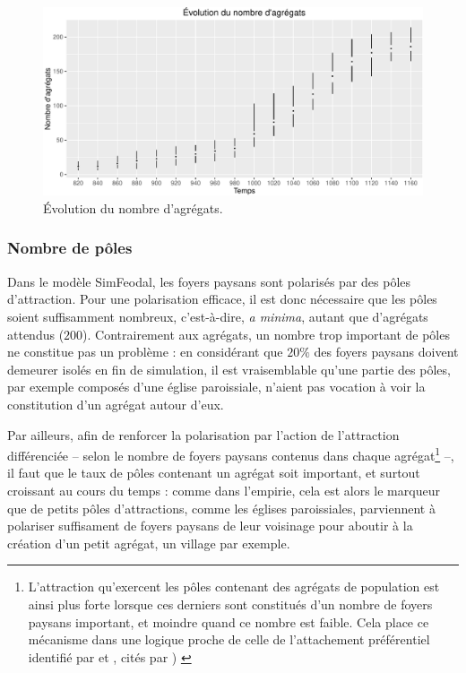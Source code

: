 \begin{figure}[H]
\captionsetup{width=\linewidth}
\includegraphics[width=0.5\linewidth]{img/resultats/v0_nombre_agregats.pdf}
\caption{Évolution du nombre d'agrégats.} 
\label{fig:nombre-agregats-v0} 
\end{figure}


\clearpage

\subsubsection{Nombre de pôles}\label{para:nb-poles}

Dans le modèle SimFeodal, les foyers paysans sont polarisés par des pôles d'attraction.
Pour une polarisation efficace, il est donc nécessaire que les pôles soient suffisamment nombreux, c'est-à-dire, \textit{a minima}, autant que d'agrégats attendus ($200$).
Contrairement aux agrégats, un nombre trop important de pôles ne constitue pas un problème :
en considérant que $20\%$ des foyers paysans doivent demeurer isolés en fin de simulation, il est vraisemblable qu'une partie des pôles, par exemple composés d'une église paroissiale, n'aient pas vocation à voir la constitution d'un agrégat autour d'eux.

Par ailleurs, afin de renforcer la polarisation par l'action de l'attraction différenciée -- selon le nombre de foyers paysans contenus dans chaque agrégat\footnote{\label{ftn:preferential-attachment}
L'attraction qu'exercent les pôles contenant des agrégats de population est ainsi plus forte lorsque ces derniers sont constitués d'un nombre de foyers paysans important, et moindre quand ce nombre est faible.
Cela place ce mécanisme dans une logique proche de celle de l'attachement préférentiel identifié par \autocite{yule1925ii} et  \autocite{simon1955class}, cités par \autocite[93]{schmitt_modelisation_2014}) \label{ftn:attachement-preferentiel}
} --, il faut que le taux de pôles contenant un agrégat soit important, et surtout croissant au cours du temps :
comme dans l'empirie, cela est alors le marqueur que de petits pôles d'attractions, comme les églises paroissiales, parviennent à polariser suffisament de foyers paysans de leur voisinage pour aboutir à la création d'un petit agrégat, un village par exemple.

